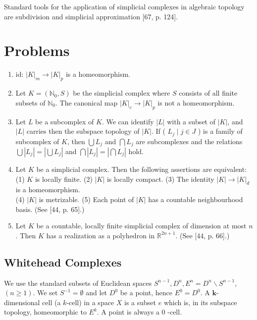 \documentclass[10pt, letterpaper]{article}
\begin{document}
Standard tools for the application of simplicial complexes in algebraic topology are subdivision and simplicial approximation [67, p. 124].

\section*{Problems}
\begin{enumerate}
  \item id: $|K|_{m} \rightarrow|K|_{p}$ is a homeomorphism.
  \item Let $K=\left(\mathbb{N}_{0}, S\right)$ be the simplicial complex where $S$ consists of all finite subsets of $\mathbb{N}_{0}$. The canonical map $|K|_{c} \rightarrow|K|_{p}$ is not a homeomorphism.
  \item Let $L$ be a subcomplex of $K$. We can identify $|L|$ with a subset of $|K|$, and $|L|$ carries then the subspace topology of $|K|$. If ( $L_{j} \mid j \in J$ ) is a family of subcomplex of $K$, then $\bigcup L_{j}$ and $\bigcap L_{j}$ are subcomplexes and the relations $\bigcup\left|L_{j}\right|=\left|\bigcup L_{j}\right|$ and $\bigcap\left|L_{j}\right|=\left|\bigcap L_{j}\right|$ hold.
  \item Let $K$ be a simplicial complex. Then the following assertions are equivalent: (1) $K$ is locally finite. (2) $|K|$ is locally compact. (3) The identity $|K| \rightarrow|K|_{d}$ is a homeomorphism.\\
(4) $|K|$ is metrizable. (5) Each point of $|K|$ has a countable neighbourhood basis. (See [44, p. 65].)
  \item Let $K$ be a countable, locally finite simplicial complex of dimension at most $n$. Then $K$ has a realization as a polyhedron in $\mathbb{R}^{2 n+1}$. (See [44, p. 66].)
\end{enumerate}

\subsection*{Whitehead Complexes}
We use the standard subsets of Euclidean spaces $S^{n-1}, D^{n}, E^{n}=D^{n} \backslash S^{n-1}$, $(n \geq 1)$. We set $S^{-1}=\emptyset$ and let $D^{0}$ be a point, hence $E^{0}=D^{0}$. A $\boldsymbol{k}$-dimensional cell (a $k$-cell) in a space $X$ is a subset $e$ which is, in its subspace topology, homeomorphic to $E^{k}$. A point is always a 0 -cell.
\end{document}
